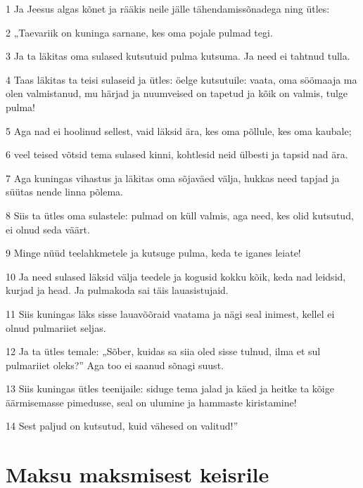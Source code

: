 \par 1 Ja Jeesus algas kõnet ja rääkis neile jälle tähendamissõnadega ning ütles:
\par 2 „Taevariik on kuninga sarnane, kes oma pojale pulmad tegi.
\par 3 Ja ta läkitas oma sulased kutsutuid pulma kutsuma. Ja need ei tahtnud tulla.
\par 4 Taas läkitas ta teisi sulaseid ja ütles: öelge kutsutuile: vaata, oma söömaaja ma olen valmistanud, mu härjad ja nuumveised on tapetud ja kõik on valmis, tulge pulma!
\par 5 Aga nad ei hoolinud sellest, vaid läksid ära, kes oma põllule, kes oma kaubale;
\par 6 veel teised võtsid tema sulased kinni, kohtlesid neid ülbesti ja tapsid nad ära.
\par 7 Aga kuningas vihastus ja läkitas oma sõjaväed välja, hukkas need tapjad ja süütas nende linna põlema.
\par 8 Siis ta ütles oma sulastele: pulmad on küll valmis, aga need, kes olid kutsutud, ei olnud seda väärt.
\par 9 Minge nüüd teelahkmetele ja kutsuge pulma, keda te iganes leiate!
\par 10 Ja need sulased läksid välja teedele ja kogusid kokku kõik, keda nad leidsid, kurjad ja head. Ja pulmakoda sai täis lauasistujaid.
\par 11 Siis kuningas läks sisse lauavõõraid vaatama ja nägi seal inimest, kellel ei olnud pulmariiet seljas.
\par 12 Ja ta ütles temale: „Sõber, kuidas sa siia oled sisse tulnud, ilma et sul pulmariiet oleks?” Aga too ei saanud sõnagi suust.
\par 13 Siis kuningas ütles teenijaile: siduge tema jalad ja käed ja heitke ta kõige äärmisemasse pimedusse, seal on ulumine ja hammaste kiristamine!
\par 14 Sest paljud on kutsutud, kuid vähesed on valitud!”

\section*{Maksu maksmisest keisrile}

